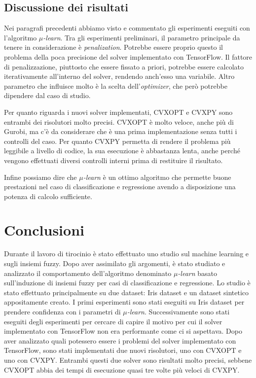 \documentclass[a4paper,12pt]{report}
\begin{document}
\section{Discussione dei risultati}
Nei paragrafi precedenti abbiamo visto e commentato gli esperimenti eseguiti con l'algoritmo \textit{$\mu$-learn}. Tra gli esperimenti preliminari, il parametro principale da tenere in considerazione è \textit{penalization}. Potrebbe essere proprio questo il problema della poca precisione del solver implementato con TensorFlow. Il fattore di penalizzazione, piuttosto che essere fissato a priori, potrebbe essere calcolato iterativamente all'interno del solver, rendendo anch'esso una variabile. Altro parametro che influisce molto è la scelta dell'\textit{optimizer}, che però potrebbe dipendere dal caso di studio. 

Per quanto riguarda i nuovi solver implementati, CVXOPT e CVXPY sono entrambi dei risolutori molto precisi. CVXOPT è molto veloce, anche più di Gurobi, ma c'è da considerare che è una prima implementazione senza tutti i controlli del caso. Per quanto CVXPY permetta di rendere il problema più leggibile a livello di codice, la sua esecuzione è abbastanza lenta, anche perché vengono effettuati diversi controlli interni prima di restituire il risultato.

Infine possiamo dire che \textit{$\mu$-learn} è un ottimo algoritmo che permette buone prestazioni nel caso di classificazione e regressione avendo a disposizione una potenza di calcolo sufficiente.




\chapter*{Conclusioni}
\label{Conclusioni}
Durante il lavoro di tirocinio è stato effettuato uno studio sul machine learning e sugli insiemi fuzzy.
Dopo aver assimilato gli argomenti, è stato studiato e analizzato il comportamento dell'algoritmo denominato \textit{$\mu$-learn} basato sull'induzione di insiemi fuzzy per casi di classificazione e regressione. Lo studio è stato effettuato principalmente su due dataset: Iris dataset e un dataset sintetico appositamente creato. I primi esperimenti sono stati eseguiti su Iris dataset per prendere confidenza con i parametri di \textit{$\mu$-learn}. Successivamente sono stati eseguiti degli esperimenti per cercare di capire il motivo per cui il solver implementato con TensorFlow non era performante come ci si aspettava. Dopo aver analizzato quali potessero essere i problemi del solver implementato con TensorFlow, sono stati implementati due nuovi risolutori, uno con CVXOPT e uno con CVXPY. Entrambi questi due solver sono risultati molto precisi, sebbene CVXOPT abbia dei tempi di esecuzione quasi tre volte più veloci di CVXPY.
\end{document}
